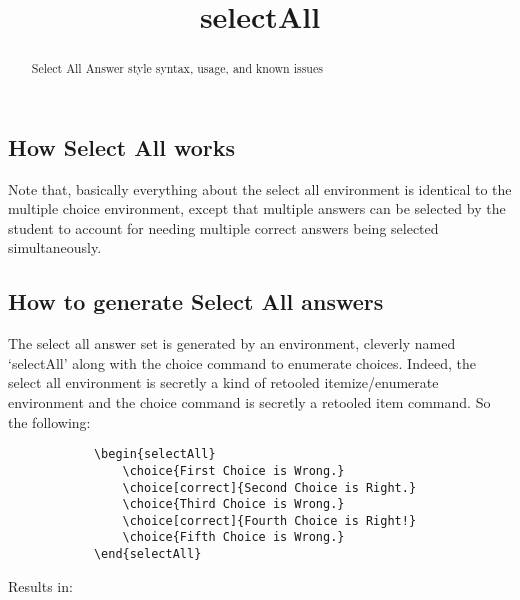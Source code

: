 \documentclass{ximera}
\title{selectAll}
\begin{document}
\begin{abstract}
    Select All Answer style syntax, usage, and known issues 
\end{abstract}
\maketitle

    \subsection*{How Select All works}
    
        Note that, basically everything about the select all environment is identical to the multiple choice environment, except that multiple answers can be selected by the student to account for needing multiple correct answers being selected simultaneously.
    
    \subsection*{How to generate Select All answers}
    
        The select all answer set is generated by an environment, cleverly named `selectAll' along with the choice command to enumerate choices. Indeed, the select all environment is secretly a kind of retooled itemize/enumerate environment and the choice command is secretly a retooled item command. So the following:
        \begin{verbatim}
            \begin{selectAll}
                \choice{First Choice is Wrong.}
                \choice[correct]{Second Choice is Right.}
                \choice{Third Choice is Wrong.}
                \choice[correct]{Fourth Choice is Right!}
                \choice{Fifth Choice is Wrong.}
            \end{selectAll}
        \end{verbatim}
        Results in:
        \begin{selectAll}
        \end{selectAll}
        
\end{document}
